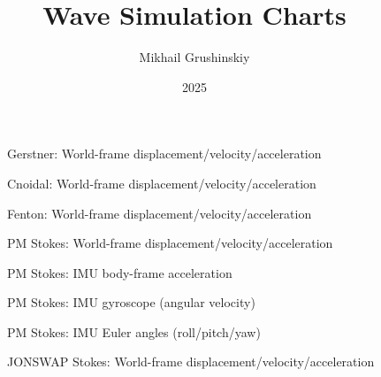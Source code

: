 \documentclass[11pt,letterpaper]{article}
\title{Wave Simulation Charts}
\author{Mikhail Grushinskiy}
\date{2025}
\begin{document}
    \maketitle

    \begin{figure}[H]\centering
    \resizebox{\textwidth}{!}{}
    \caption{Gerstner: World-frame displacement/velocity/acceleration}
    \label{fig:gerstner_world}
    \end{figure}

    \begin{figure}[H]\centering
    \resizebox{\textwidth}{!}{}
    \caption{Cnoidal: World-frame displacement/velocity/acceleration}
    \label{fig:cnoidal_world}
    \end{figure}

    \begin{figure}[H]\centering
    \resizebox{\textwidth}{!}{}
    \caption{Fenton: World-frame displacement/velocity/acceleration}
    \label{fig:fenton_world}
    \end{figure}

    \begin{figure}[H]\centering
    \resizebox{\textwidth}{!}{}
    \caption{PM Stokes: World-frame displacement/velocity/acceleration}
    \label{fig:pmstokes_world}
    \end{figure}

    \begin{figure}[H]\centering
    \resizebox{\textwidth}{!}{}
    \caption{PM Stokes: IMU body-frame acceleration}
    \label{fig:pmstokes_imu_acc}
    \end{figure}

    \begin{figure}[H]\centering
    \resizebox{\textwidth}{!}{}
    \caption{PM Stokes: IMU gyroscope (angular velocity)}
    \label{fig:pmstokes_imu_gyro}
    \end{figure}

    \begin{figure}[H]\centering
    \resizebox{\textwidth}{!}{}
    \caption{PM Stokes: IMU Euler angles (roll/pitch/yaw)}
    \label{fig:pmstokes_euler}
    \end{figure}

    \begin{figure}[H]\centering
    \resizebox{\textwidth}{!}{}
    \caption{JONSWAP Stokes: World-frame displacement/velocity/acceleration}
    \label{fig:jonswap_world}
    \end{figure}
\end{document}
